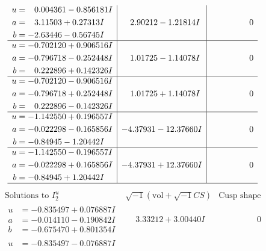 \documentclass[1p]{elsarticle_modified}
\theoremstyle{definition}
\newcommand{\I}{\sqrt{-1}}
\begin{document}
$$\begin{array}{c|c|c}
\begin{aligned}
u &= \phantom{-}0.004361 - 0.856181 I \\
a &= \phantom{-}3.11503 + 0.27313 I \\
b &= -2.63446 - 0.56745 I\end{aligned}
 & \phantom{-}2.90212 - 1.21814 I & \phantom{-0.000000 } 0 \\ \hline\begin{aligned}
u &= -0.702120 + 0.906516 I \\
a &= -0.796718 - 0.252448 I \\
b &= \phantom{-}0.222896 + 0.142326 I\end{aligned}
 & \phantom{-}1.01725 - 1.14078 I & \phantom{-0.000000 } 0 \\ \hline\begin{aligned}
u &= -0.702120 - 0.906516 I \\
a &= -0.796718 + 0.252448 I \\
b &= \phantom{-}0.222896 - 0.142326 I\end{aligned}
 & \phantom{-}1.01725 + 1.14078 I & \phantom{-0.000000 } 0 \\ \hline\begin{aligned}
u &= -1.142550 + 0.196557 I \\
a &= -0.022298 - 0.165856 I \\
b &= -0.84945 - 1.20442 I\end{aligned}
 & -4.37931 - 12.37660 I & \phantom{-0.000000 } 0 \\ \hline\begin{aligned}
u &= -1.142550 - 0.196557 I \\
a &= -0.022298 + 0.165856 I \\
b &= -0.84945 + 1.20442 I\end{aligned}
 & -4.37931 + 12.37660 I & \phantom{-0.000000 } 0\\
 \hline 
 \end{array}$$\newpage$$\begin{array}{c|c|c}  
\text{Solutions to }I^u_{2}& \I (\text{vol} + \sqrt{-1}CS) & \text{Cusp shape}\\
 \hline 
\begin{aligned}
u &= -0.835497 + 0.076887 I \\
a &= -0.014110 - 0.190842 I \\
b &= -0.675470 + 0.801354 I\end{aligned}
 & \phantom{-}3.33212 + 3.00440 I & \phantom{-0.000000 } 0 \\ \hline\begin{aligned}
u &= -0.835497 - 0.076887 I \\

\end{aligned}
\end{array}$$
\end{document}
